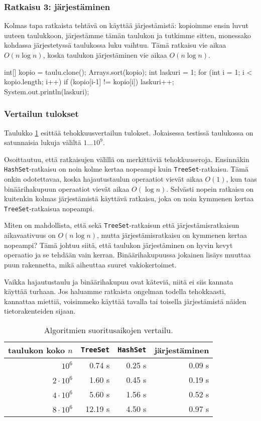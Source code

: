 \subsubsection{Ratkaisu 3: järjestäminen}

Kolmas tapa ratkaista tehtävä on käyttää järjestämistä:
kopioimme ensin luvut uuteen taulukkoon, järjestämme tämän taulukon ja
tutkimme sitten, monessako kohdassa järjestetyssä taulukossa luku vaihtuu.
Tämä ratkaisu vie aikaa $O(n \log n)$, koska taulukon järjestäminen
vie aikaa $O(n \log n)$.

\begin{code}
int[] kopio = taulu.clone();
Arrays.sort(kopio);
int laskuri = 1;
for (int i = 1; i < kopio.length; i++) {
    if (kopio[i-1] != kopio[i]) laskuri++;
}
System.out.println(laskuri);
\end{code}

\subsubsection{Vertailun tulokset}

Taulukko \ref{tab:eriver} esittää tehokkuusvertailun tulokset.
Jokaisessa testissä taulukossa on satunnaisia lukuja väliltä $1 \dots 10^9$.

Osoittautuu, että ratkaisujen välillä on merkittäviä tehokkuuseroja.
Ensinnäkin \texttt{HashSet}-ratkaisu on noin kolme kertaa
nopeampi kuin \texttt{TreeSet}-ratkaisu.
Tämä onkin odotettavaa, koska hajautustaulun
operaatiot vievät aikaa $O(1)$, kun taas binäärihakupuun
operaatiot vievät aikaa $O(\log n)$.
Selvästi nopein ratkaisu on kuitenkin kolmas järjestämistä
käyttävä ratkaisu, joka on noin kymmenen kertaa
\texttt{TreeSet}-ratkaisua nopeampi.

Miten on mahdollista, että sekä \texttt{TreeSet}-ratkaisun että
järjestämisrat\-kaisun aikavaativuus on $O(n \log n)$, mutta
järjestämisratkaisu on kymmenen kertaa nopeampi?
Tämä johtuu siitä, että taulukon järjestäminen on hyvin kevyt
operaatio ja se tehdään vain kerran.
Binäärihakupuussa jokainen lisäys muuttaa puun rakennetta,
mikä aiheuttaa suuret vakiokertoimet.

Vaikka hajautustaulu ja binäärihakupuu ovat käteviä,
niitä ei siis kannata käyttää turhaan.
Jos haluamme ratkaista ongelman todella tehokkaasti,
kannattaa miettiä, voisimmeko käyttää tavalla tai toisella
järjestämistä näiden tietorakenteiden sijaan.

\begin{table}
\center
\begin{tabular}{rrrr}
taulukon koko $n$ & \texttt{TreeSet} & \texttt{HashSet} & järjestäminen \\
\hline
$10^6$ & 0.74 s & 0.25 s & 0.09 s \\
$2 \cdot 10^6$ & 1.60 s & 0.45 s & 0.19 s \\
$4 \cdot 10^6$ & 5.60 s & 1.56 s & 0.52 s \\
$8 \cdot 10^6$ & 12.19 s & 4.50 s & 0.97 s \\
\end{tabular}
\caption{Algoritmien suoritusaikojen vertailu.}
\label{tab:eriver}
\end{table}
